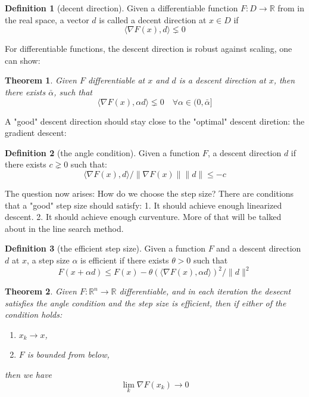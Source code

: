 \documentclass[a4paper,11pt,fleqn, draft]{book}
\newtheorem{theorem}{Theorem}[section]
\theoremstyle{definition}
\newtheorem{definition}{Definition}[section]
\theoremstyle{remark}
\newcommand{\R}{\mathbb{R}}
\newcommand{\Rn}{\mathbb{R}^n}
\begin{document}
\begin{definition}[decent direction]
	Given a differentiable function $F: D \rightarrow \R$ from in the real space, a vector $d$ is called a decent direction at $x \in D$ if 
	\[\langle \nabla F (x), d \rangle \lneq 0\]
\end{definition}

For differentiable functions, the descent direction is robust against scaling, one can show: 

\begin{theorem}
	Given $F$ differentiable at $x$ and $d$ is a descent direction at $x$, then there exists $\bar{\alpha}$, such that
	\[\langle \nabla F(x), \alpha d \rangle  \lneq 0 \quad \forall \alpha  \in (0, \bar{\alpha}] \]
\end{theorem}

A "good" descent direction should stay close to the "optimal" descent diretion: the gradient descent:
\begin{definition}[the angle condition]
	Given a function $F$, a descent direction $d$ if there exists $c \gneq 0$ such that:
	\[
	\langle \nabla F(x), d \rangle / \|\nabla F(x)\| \|d\| \le -c
	\]
\end{definition}

The question now arises: How do we choose the step size? There are conditions that a "good" step size should satisfy: 
1. It should achieve enough linearized descent. 
2. It should achieve enough curventure. 
More of that will be talked about in the line search method. 

\begin{definition}[the efficient step size]
	Given a function $F$ and a descent direction $d$ at $x$, 
	a step size $\alpha$ is efficient if there exists $ \theta > 0$ such that
	\[ F(x + \alpha d) \le F(x) -  \theta (\langle \nabla F(x),  \alpha d \rangle)^2 / \|d\|^2  \]
\end{definition}

\begin{theorem}
	Given $F : \Rn \rightarrow \R$ differentiable, and in each iteration the desecnt 
	satisfies the angle condition and the step size is efficient, then if either of 
	the condition holds:
	\begin{enumerate}
		\item $x_k \rightarrow x$,
		\item $F$ is bounded from below,
	\end{enumerate}
	then we have
	\[
	\lim_k \nabla F(x_k) \rightarrow 0
	\]
\end{theorem}
\end{document}
